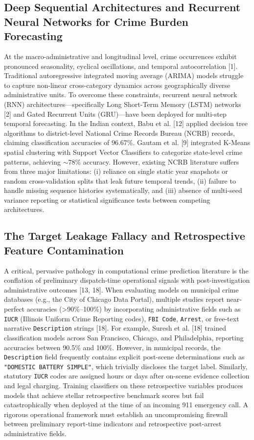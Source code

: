 \documentclass[runningheads]{llncs}
\begin{document}
\subsection{Deep Sequential Architectures and Recurrent Neural Networks for Crime Burden Forecasting}
At the macro-administrative and longitudinal level, crime occurrences exhibit pronounced seasonality, cyclical oscillations, and temporal autocorrelation [1]. Traditional autoregressive integrated moving average (ARIMA) models struggle to capture non-linear cross-category dynamics across geographically diverse administrative units. To overcome these constraints, recurrent neural network (RNN) architectures---specifically Long Short-Term Memory (LSTM) networks [2] and Gated Recurrent Units (GRU)---have been deployed for multi-step temporal forecasting. In the Indian context, Babu et al. [12] applied decision tree algorithms to district-level National Crime Records Bureau (NCRB) records, claiming classification accuracies of 96.67\%. Gautam et al. [9] integrated K-Means spatial clustering with Support Vector Classifiers to categorize state-level crime patterns, achieving $\sim$78\% accuracy. However, existing NCRB literature suffers from three major limitations: (i) reliance on single static year snapshots or random cross-validation splits that leak future temporal trends, (ii) failure to handle missing sequence histories systematically, and (iii) absence of multi-seed variance reporting or statistical significance tests between competing architectures.

\subsection{The Target Leakage Fallacy and Retrospective Feature Contamination}
A critical, pervasive pathology in computational crime prediction literature is the conflation of preliminary dispatch-time operational signals with post-investigation administrative outcomes [13, 18]. When evaluating models on municipal crime databases (e.g., the City of Chicago Data Portal), multiple studies report near-perfect accuracies (>90\%--100\%) by incorporating administrative fields such as \texttt{IUCR} (Illinois Uniform Crime Reporting codes), \texttt{FBI Code}, \texttt{Arrest}, or free-text narrative \texttt{Description} strings [18]. For example, Suresh et al. [18] trained classification models across San Francisco, Chicago, and Philadelphia, reporting accuracies between 90.5\% and 100\%. However, in municipal records, the \texttt{Description} field frequently contains explicit post-scene determinations such as \texttt{"DOMESTIC BATTERY SIMPLE"}, which trivially discloses the target label. Similarly, statutory \texttt{IUCR} codes are assigned hours or days after on-scene evidence collection and legal charging. Training classifiers on these retrospective variables produces models that achieve stellar retrospective benchmark scores but fail catastrophically when deployed at the time of an incoming 911 emergency call. A rigorous operational framework must establish an uncompromising firewall between preliminary report-time indicators and retrospective post-arrest administrative fields.
\end{document}
